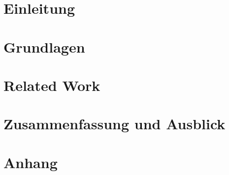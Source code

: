 
\chapter{Einleitung}
\label{chap:einleitung}


\chapter{Grundlagen}
\label{chap:grundlagen}



\chapter{Related Work}
\label{chap:related}


\chapter{Zusammenfassung und Ausblick} 
\label{chap:zus}


\appendix

\chapter{Anhang}

